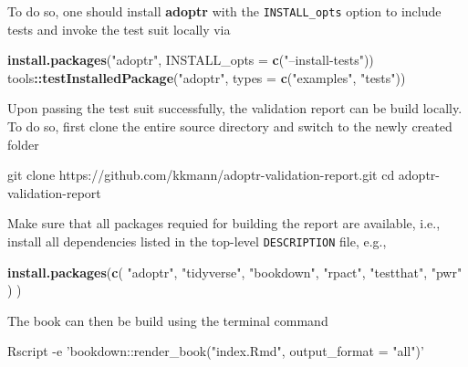 \documentclass[]{book}
\newenvironment{Shaded}{\begin{snugshade}}{\end{snugshade}}
\newcommand{\BuiltInTok}[1]{#1}
\newcommand{\DataTypeTok}[1]{\textcolor[rgb]{0.13,0.29,0.53}{#1}}
\newcommand{\ExtensionTok}[1]{#1}
\newcommand{\FunctionTok}[1]{\textcolor[rgb]{0.00,0.00,0.00}{#1}}
\newcommand{\KeywordTok}[1]{\textcolor[rgb]{0.13,0.29,0.53}{\textbf{#1}}}
\newcommand{\NormalTok}[1]{#1}
\newcommand{\OperatorTok}[1]{\textcolor[rgb]{0.81,0.36,0.00}{\textbf{#1}}}
\newcommand{\StringTok}[1]{\textcolor[rgb]{0.31,0.60,0.02}{#1}}
\begin{document}
To do so, one should install \textbf{adoptr} with the \texttt{INSTALL\_opts} option
to include tests and invoke the test suit locally via

\begin{Shaded}
\begin{Highlighting}[]
\KeywordTok{install.packages}\NormalTok{(}\StringTok{"adoptr"}\NormalTok{, }\DataTypeTok{INSTALL_opts =} \KeywordTok{c}\NormalTok{(}\StringTok{"--install-tests"}\NormalTok{))}
\NormalTok{tools}\OperatorTok{::}\KeywordTok{testInstalledPackage}\NormalTok{(}\StringTok{"adoptr"}\NormalTok{, }\DataTypeTok{types =} \KeywordTok{c}\NormalTok{(}\StringTok{"examples"}\NormalTok{, }\StringTok{"tests"}\NormalTok{))}
\end{Highlighting}
\end{Shaded}

Upon passing the test suit successfully, the validation report
can be build locally.
To do so, first clone the entire source directory and switch
to the newly created folder

\begin{Shaded}
\begin{Highlighting}[]
\FunctionTok{git}\NormalTok{ clone https://github.com/kkmann/adoptr-validation-report.git}
\BuiltInTok{cd}\NormalTok{ adoptr-validation-report}
\end{Highlighting}
\end{Shaded}

Make sure that all packages requied for building the report are
available, i.e., install all dependencies listed in the top-level
\texttt{DESCRIPTION} file, e.g.,

\begin{Shaded}
\begin{Highlighting}[]
\KeywordTok{install.packages}\NormalTok{(}\KeywordTok{c}\NormalTok{(}
    \StringTok{"adoptr"}\NormalTok{, }
    \StringTok{"tidyverse"}\NormalTok{, }
    \StringTok{"bookdown"}\NormalTok{, }
    \StringTok{"rpact"}\NormalTok{, }
    \StringTok{"testthat"}\NormalTok{, }
    \StringTok{"pwr"}\NormalTok{ ) )}
\end{Highlighting}
\end{Shaded}

The book can then be build using the terminal command

\begin{Shaded}
\begin{Highlighting}[]
\ExtensionTok{Rscript}\NormalTok{ -e }\StringTok{'bookdown::render_book("index.Rmd", output_format = "all")'}
\end{Highlighting}
\end{Shaded}
\end{document}
